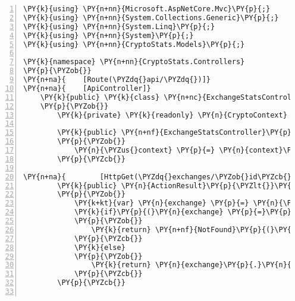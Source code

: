\def\PYZbs{\char`\\}
\def\PYZus{\char`\_}
\def\PYZob{\char`\{}
\def\PYZcb{\char`\}}
\def\PYZca{\char`\^}
\def\PYZam{\char`\&}
\def\PYZlt{\char`\<}
\def\PYZgt{\char`\>}
\def\PYZsh{\char`\#}
\def\PYZpc{\char`\%}
\def\PYZdl{\char`\$}
\def\PYZhy{\char`\-}
\def\PYZsq{\char`\'}
\def\PYZdq{\char`\"}
\def\PYZti{\char`\~}
\def\PYZat{@}
\def\PYZlb{[}
\def\PYZrb{]}
\makeatother\begin{Verbatim}[commandchars=\\\{\},numbers=left,firstnumber=1,stepnumber=1,numberblanklines=0]
\PY{k}{using} \PY{n+nn}{Microsoft.AspNetCore.Mvc}\PY{p}{;}
\PY{k}{using} \PY{n+nn}{System.Collections.Generic}\PY{p}{;}
\PY{k}{using} \PY{n+nn}{System.Linq}\PY{p}{;}
\PY{k}{using} \PY{n+nn}{System}\PY{p}{;}
\PY{k}{using} \PY{n+nn}{CryptoStats.Models}\PY{p}{;}

\PY{k}{namespace} \PY{n+nn}{CryptoStats.Controllers}
\PY{p}{\PYZob{}}
\PY{n+na}{    [Route(\PYZdq{}api/\PYZdq{})]}
\PY{n+na}{    [ApiController]}
    \PY{k}{public} \PY{k}{class} \PY{n+nc}{ExchangeStatsController} \PY{p}{:} \PY{n}{ControllerBase}
    \PY{p}{\PYZob{}}
        \PY{k}{private} \PY{k}{readonly} \PY{n}{CryptoContext} \PY{n}{\PYZus{}context}\PY{p}{;}

        \PY{k}{public} \PY{n+nf}{ExchangeStatsController}\PY{p}{(}\PY{n}{CryptoContext} \PY{n}{context}\PY{p}{)}
        \PY{p}{\PYZob{}}
            \PY{n}{\PYZus{}context} \PY{p}{=} \PY{n}{context}\PY{p}{;}
        \PY{p}{\PYZcb{}}

\PY{n+na}{        [HttpGet(\PYZdq{}exchanges/\PYZob{}id\PYZcb{}/stats\PYZdq{})]}
        \PY{k}{public} \PY{n}{ActionResult}\PY{p}{\PYZlt{}}\PY{n}{List}\PY{p}{\PYZlt{}}\PY{n}{Stat}\PY{p}{\PYZgt{}}\PY{p}{\PYZgt{}} \PY{n}{GetAll}\PY{p}{(}\PY{k+kt}{int} \PY{n}{id}\PY{p}{)}
        \PY{p}{\PYZob{}}
            \PY{k+kt}{var} \PY{n}{exchange} \PY{p}{=} \PY{n}{\PYZus{}context}\PY{p}{.}\PY{n}{Exchanges}\PY{p}{.}\PY{n}{Where}\PY{p}{(}\PY{n}{e} \PY{p}{=}\PY{p}{\PYZgt{}} \PY{n}{e}\PY{p}{.}\PY{n}{ExchangeId} \PY{p}{=}\PY{p}{=} \PY{n}{id}\PY{p}{)}\PY{p}{.}\PY{n}{First}\PY{p}{(}\PY{p}{)}\PY{p}{;}
            \PY{k}{if}\PY{p}{(}\PY{n}{exchange} \PY{p}{=}\PY{p}{=} \PY{k}{null}\PY{p}{)}
            \PY{p}{\PYZob{}}
                \PY{k}{return} \PY{n+nf}{NotFound}\PY{p}{(}\PY{p}{)}\PY{p}{;}
            \PY{p}{\PYZcb{}}
            \PY{k}{else}
            \PY{p}{\PYZob{}}
                \PY{k}{return} \PY{n}{exchange}\PY{p}{.}\PY{n}{Stats}\PY{p}{;}
            \PY{p}{\PYZcb{}}
        \PY{p}{\PYZcb{}}


\end{Verbatim}
